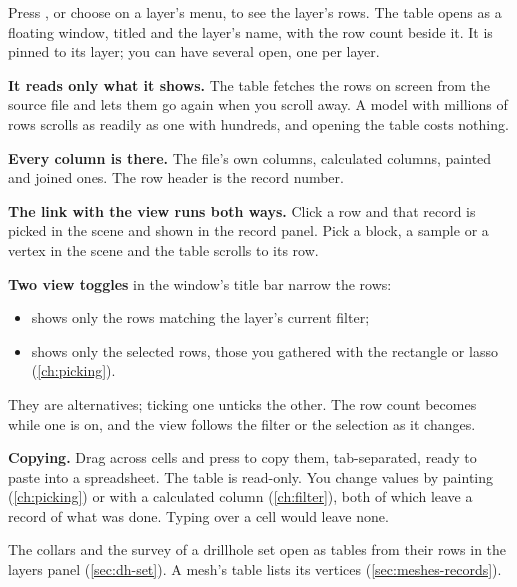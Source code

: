 Press , or choose  on a layer's menu, to see the layer's rows. The table opens as a floating window, titled  and the layer's name, with the row count beside it. It is pinned to its layer; you can have several open, one per layer.


\textbf{It reads only what it shows.} The table fetches the rows on screen from the source file and lets them go again when you scroll away. A model with millions of rows scrolls as readily as one with hundreds, and opening the table costs nothing.

\textbf{Every column is there.} The file's own columns, calculated columns, painted and joined ones. The row header is the record number.

\textbf{The link with the view runs both ways.} Click a row and that record is picked in the scene and shown in the record panel. Pick a block, a sample or a vertex in the scene and the table scrolls to its row.

\textbf{Two view toggles} in the window's title bar narrow the rows:

\begin{itemize}
\item {} shows only the rows matching the layer's current filter;
\item {} shows only the selected rows, those you gathered with the rectangle or lasso (\cref{ch:picking}).
\end{itemize}

They are alternatives; ticking one unticks the other. The row count becomes  while one is on, and the view follows the filter or the selection as it changes.

\textbf{Copying.} Drag across cells and press  to copy them, tab-separated, ready to paste into a spreadsheet. The table is read-only. You change values by painting (\cref{ch:picking}) or with a calculated column (\cref{ch:filter}), both of which leave a record of what was done. Typing over a cell would leave none.

The collars and the survey of a drillhole set open as tables from their rows in the layers panel (\cref{sec:dh-set}). A mesh's table lists its vertices (\cref{sec:meshes-records}).

